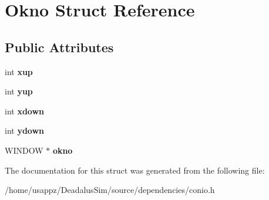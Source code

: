 \hypertarget{structOkno}{\section{\-Okno \-Struct \-Reference}
\label{structOkno}
}
\subsection*{\-Public \-Attributes}
\begin{DoxyCompactItemize}
\item 
\hypertarget{structOkno_a64babe6aa39916ce92abded14d526ade}{int {\bfseries xup}}\label{structOkno_a64babe6aa39916ce92abded14d526ade}

\item 
\hypertarget{structOkno_a9893576eee0e17561ba4aebfcb7e44c1}{int {\bfseries yup}}\label{structOkno_a9893576eee0e17561ba4aebfcb7e44c1}

\item 
\hypertarget{structOkno_a6b139259d2410acffef63d84716111bd}{int {\bfseries xdown}}\label{structOkno_a6b139259d2410acffef63d84716111bd}

\item 
\hypertarget{structOkno_a9320b0845b7bd9849fd299a41125f507}{int {\bfseries ydown}}\label{structOkno_a9320b0845b7bd9849fd299a41125f507}

\item 
\hypertarget{structOkno_a3c458829d0cb66b61a52414f7b704333}{\-W\-I\-N\-D\-O\-W $\ast$ {\bfseries okno}}\label{structOkno_a3c458829d0cb66b61a52414f7b704333}

\end{DoxyCompactItemize}


\-The documentation for this struct was generated from the following file\-:\begin{DoxyCompactItemize}
\item 
/home/usappz/\-Deadalus\-Sim/source/dependencies/conio.\-h\end{DoxyCompactItemize}
